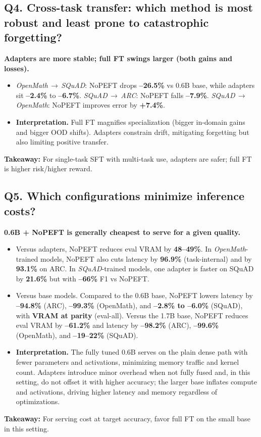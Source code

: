 \documentclass[11pt,a4paper]{article}
\begin{document}
\subsection*{Q4. Cross-task transfer: which method is most robust and least prone to catastrophic forgetting?}
\textbf{Adapters are more stable; full FT swings larger (both gains and losses).}
\begin{itemize}
  \item \textit{OpenMath}\,$\rightarrow$\,\textit{SQuAD}: NoPEFT drops \textbf{--26.5\%} vs 0.6B base, while adapters sit \textbf{--2.4\%} to \textbf{--6.7\%}. \textit{SQuAD}\,$\rightarrow$\,\textit{ARC}: NoPEFT falls \textbf{--7.9\%}. \textit{SQuAD}\,$\rightarrow$\,\textit{OpenMath}: NoPEFT improves error by \textbf{+7.4\%}.
  \item \textbf{Interpretation.} Full FT magnifies specialization (bigger in-domain gains and bigger OOD shifts). Adapters constrain drift, mitigating forgetting but also limiting positive transfer.
\end{itemize}
\textbf{Takeaway:} For single-task SFT with multi-task use, adapters are safer; full FT is higher risk/higher reward.

\subsection*{Q5. Which configurations minimize inference costs?}
\textbf{0.6B + NoPEFT is generally cheapest to serve for a given quality.}
\begin{itemize}
  \item Versus adapters, NoPEFT reduces eval VRAM by \textbf{48--49\%}. In \textit{OpenMath}-trained models, NoPEFT also cuts latency by \textbf{96.9\%} (task-internal) and by \textbf{93.1\%} on ARC. In \textit{SQuAD}-trained models, one adapter is faster on SQuAD by \textbf{21.6\%} but with \textbf{--66\%} F1 vs NoPEFT.
  \item Versus base models. Compared to the 0.6B base, NoPEFT lowers latency by \textbf{--94.8\%} (ARC), \textbf{--99.3\%} (OpenMath), and \textbf{--2.8\% to --6.0\%} (SQuAD), with \textbf{VRAM at parity} (eval-all). Versus the 1.7B base, NoPEFT reduces eval VRAM by \textbf{--61.2\%} and latency by \textbf{--98.2\%} (ARC), \textbf{--99.6\%} (OpenMath), and \textbf{--19--22\%} (SQuAD).
  \item \textbf{Interpretation.} The fully tuned 0.6B serves on the plain dense path with fewer parameters and activations, minimizing memory traffic and kernel count. Adapters introduce minor overhead when not fully fused and, in this setting, do not offset it with higher accuracy; the larger base inflates compute and activations, driving higher latency and memory regardless of optimizations.
\end{itemize}
\textbf{Takeaway:} For serving cost at target accuracy, favor full FT on the small base in this setting.
\end{document}
